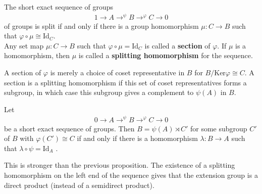 \documentclass{memoir}
\begin{document}
\begin{prop}
	The short exact sequence of groups
	\begin{align*}
		1 \to A \to^{\psi }B \to^{\varphi }C \to 0
	\end{align*}
	of groups is split if and only if there is a group homomorphism \(\mu :C\to B\) such that \(\varphi \circ \mu \cong \textrm{Id}_C \).\\

	Any set map \(\mu :C\to B\) such that \(\varphi \circ \mu = \textrm{Id}_C\) is called a \textbf{section} of \(\varphi \). If \(\mu \) is a homomorphism, then \(\mu \) is called a \textbf{splitting homomorphism} for the sequence.
\end{prop}
A section of \(\varphi \) is merely a choice of coset representative in \(B\) for \(B / \textrm{Ker}\varphi  \cong C\). A section is a splitting homomorphism if this set of coset representatives forms a subgroup, in which case this subgroup gives a complement to \(\psi (A)\) in \(B\).

\begin{exmp}
	
\end{exmp}

\begin{prop}
	Let
	\begin{align*}
		0 \to A \to^{\psi }B \to^{\varphi }C \to 0
	\end{align*}
	be a short exact sequence of groups. Then \(B = \psi (A) \rtimes C'\) for some subgroup \(C'\) of \(B\) with \(\varphi (C') \cong C\) if and only if there is a homomorphism \(\lambda :B\to A\) such that \(\lambda \circ \psi = \textrm{Id}_A\) .
\end{prop}
This is stronger than the previous proposition. The existence of a splitting homomorphism on the left end of the sequence gives that the extension group is a direct product (instead of a semidirect product).

\end{document}
